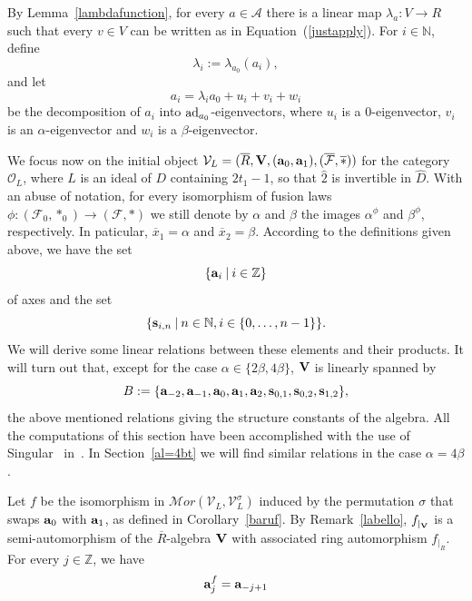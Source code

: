 \documentclass[a4paper]{amsart}
\newcommand{\N}{{\mathbb N}}
\newcommand{\Ro}{{\overline R}}
\newcommand{\Vo}{{\bf V}}
\newcommand{\ad}{{\rm ad}}
\newcommand{\Z}{{\mathbb Z}}
\newcommand{\al}{\alpha}
\newcommand{\bt}{\beta}
\newcommand{\ba}{{\bf a}}
\newcommand{\bs}{{\bf s}}
\begin{document}
By Lemma~\ref{lambdafunction}, for every $a\in \mathcal A$ there is a linear map $\lambda_a\colon V\to R$ such that every $v\in V$ can be written as in Equation~(\ref{justapply}). 
For $i\in \N$,  define
\begin{equation}\label{lambdas}
    \lambda_i:=\lambda_{a_0}(a_i),
    \end{equation} 
    and let 
 \begin{equation}\label{ai}
 a_i=\lambda_i  a_0+u_i+v_i +w_i
 \end{equation}
 be the decomposition of $a_i$ into $\ad_{a_0}$-eigenvectors, where $u_i$ is a $0$-eigenvector, $v_i$ is an $\alpha$-eigenvector and $w_i$ is a $\beta$-eigenvector.    

We focus now on the  initial object ${\mathcal V_L}=( \Ro, \Vo, (\ba_0, \ba_1), (\overline{\mathcal F}, \overline{\ast}))$ for the category $ {\mathcal O}_{L}$, where $L$ is an ideal of $D$ containing $2t_1-1$, so that $\hat 2$ is invertible in $\hat D$. 
With an abuse of notation, for every isomorphism of fusion laws $\phi\colon (\mathcal F_0, \ast_0)\to (\mathcal F, \ast)$ we still denote by $\alpha$ and $\beta$ the images $\alpha^\phi$ and $\beta^\phi$, respectively. In paticular, $\overline x_1=\al$ and $\overline x_2=\bt$. 
According to the definitions given above, we have the set  
$$\{\ba_i\:|\: i\in \mathbb Z\}$$
of axes and the set 
$$\{\bs_{i,n}\:|\: n\in \N, i\in \{0, \ldots , n-1\}\}.$$
We will derive some linear relations between these elements and their products. It will turn out that, except for the case $\al\in \{2\bt, 4\bt\}$, $\Vo$ is linearly spanned by $$B:=\{ \ba_{-2}, \ba_{-1}, \ba_0, \ba_1, \ba_2, \bs_{0,1}, \bs_{0,2}, \bs_{1,2}\},$$ the above mentioned  relations giving the structure constants of the algebra. All the computations of this section have been accomplished with the use of Singular~\cite{Singular} in~\cite[genericsakuma.s]{code}. In Section~\ref{al=4bt} we will find similar relations in the case $\al=4\bt$.
 
Let $f$ be the isomorphism in $\mathcal Mor(\mathcal V_L, \mathcal V_L^\sigma)$  induced by the permutation $\sigma$ that swaps $\ba_0$ with $\ba_1$, as  defined in Corollary~\ref{baruf}. By Remark~\ref{labello}, $f_{|_\Vo}$ is a semi-automorphism of the $\Ro$-algebra $\Vo$ with associated ring automorphism $f_{|_\Ro}$.  For every $j\in \Z$, we have
\begin{equation}\label{obviousrelationf}
\ba_j^f=\ba_{-j+1}
\end{equation}
\end{document}
